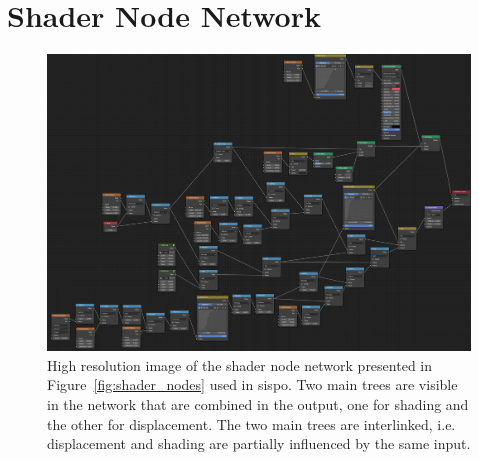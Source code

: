 \section{Shader Node Network} \label{sec:shader_node}
\begin{figure}[htb]
    \centering
    \includegraphics[height=\textwidth, width=17.8cm, angle=90]{doc/thesis/0_figures/procedural_terrain/node_network_highres.png}
    \caption{High resolution image of the shader node network presented in Figure~\ref{fig:shader_nodes} used in \gls{sispo}. Two main trees are visible in the network that are combined in the output, one for shading and the other for displacement. The two main trees are interlinked, i.e. displacement and shading are partially influenced by the same input.}
    \label{fig:node_highres}
\end{figure}


